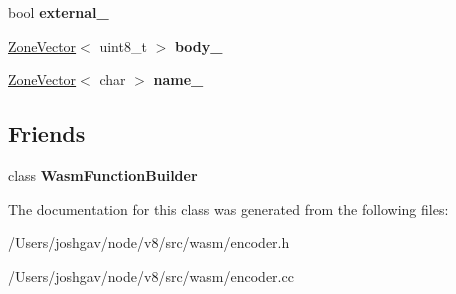 \begin{DoxyCompactItemize}
\item 
bool {\bfseries external\+\_\+}\hypertarget{classv8_1_1internal_1_1wasm_1_1_wasm_function_encoder_a2c927d99b556493a4371e36b1a57c1e0}{}\label{classv8_1_1internal_1_1wasm_1_1_wasm_function_encoder_a2c927d99b556493a4371e36b1a57c1e0}

\item 
\hyperlink{classv8_1_1internal_1_1_zone_vector}{Zone\+Vector}$<$ uint8\+\_\+t $>$ {\bfseries body\+\_\+}\hypertarget{classv8_1_1internal_1_1wasm_1_1_wasm_function_encoder_a25e3cd6d45ce1900ebf407ffecbaa0db}{}\label{classv8_1_1internal_1_1wasm_1_1_wasm_function_encoder_a25e3cd6d45ce1900ebf407ffecbaa0db}

\item 
\hyperlink{classv8_1_1internal_1_1_zone_vector}{Zone\+Vector}$<$ char $>$ {\bfseries name\+\_\+}\hypertarget{classv8_1_1internal_1_1wasm_1_1_wasm_function_encoder_a0f38624a505338e18be4d73b945ab572}{}\label{classv8_1_1internal_1_1wasm_1_1_wasm_function_encoder_a0f38624a505338e18be4d73b945ab572}

\end{DoxyCompactItemize}
\subsection*{Friends}
\begin{DoxyCompactItemize}
\item 
class {\bfseries Wasm\+Function\+Builder}\hypertarget{classv8_1_1internal_1_1wasm_1_1_wasm_function_encoder_a0210e47d50d0e44fd0f929739a275fae}{}\label{classv8_1_1internal_1_1wasm_1_1_wasm_function_encoder_a0210e47d50d0e44fd0f929739a275fae}

\end{DoxyCompactItemize}


The documentation for this class was generated from the following files\+:\begin{DoxyCompactItemize}
\item 
/\+Users/joshgav/node/v8/src/wasm/encoder.\+h\item 
/\+Users/joshgav/node/v8/src/wasm/encoder.\+cc\end{DoxyCompactItemize}
